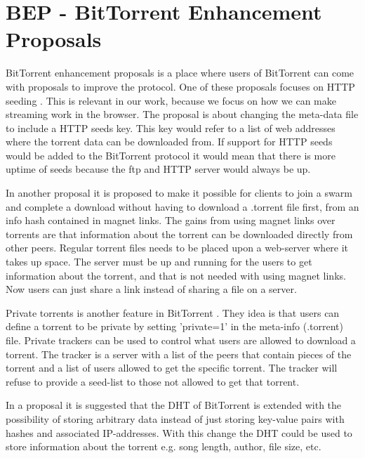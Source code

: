 \section{BEP - BitTorrent Enhancement Proposals}
BitTorrent enhancement proposals is a place where users of BitTorrent can come with proposals to improve the protocol.
One of these proposals focuses on \acs{HTTP} seeding \citep{bittorrent:bep17}.
This is relevant in our work, because we focus on how we can make streaming work in the browser. The proposal is about changing the meta-data file to include a \acs{HTTP} seeds key. This key would refer to a list of web addresses where the torrent data can be downloaded from.
If support for \acs{HTTP} seeds would be added to the BitTorrent protocol it would mean that there is more uptime of seeds because the ftp and \acs{HTTP} server would always be up.

In another proposal \citep{bittorrent:bep09} it is proposed to make it possible for clients to join a swarm and complete a download without having to download a .torrent file first, from an info hash contained in magnet links. The gains from using magnet links over torrents are that information about the torrent can be downloaded directly from other peers. Regular torrent files needs to be placed upon a web-server where it takes up space. The server must be up and running for the users to get information about the torrent, and that is not needed with using magnet links.
Now users can just share a link instead of sharing a file on a server.

Private torrents is another feature in BitTorrent \citep{bittorrent:bep27}. They idea is that users can define a torrent to be private by setting 'private=1' in the meta-info (.torrent) file. Private trackers can be used to control what users are allowed to download a torrent. The tracker is a server with a list of the peers that contain pieces of the torrent and a list of users allowed to get the specific torrent.
The tracker will refuse to provide a seed-list to those not allowed to get that torrent.

In a proposal \citep{bittorrent:bep44} it is suggested that the \acs{DHT} of BitTorrent is extended with the possibility of storing arbitrary data instead of just storing key-value pairs with hashes and associated \acs{IP}-addresses.
With this change the \acs{DHT} could be used to store information about the torrent e.g. song length, author, file size, etc.

